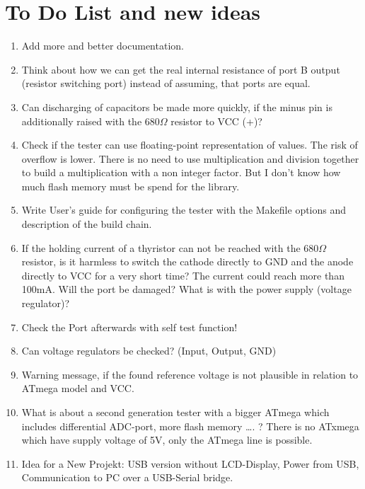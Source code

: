 
\chapter{To Do List and new ideas}
\label{sec:todo}

\begin{enumerate}
\item Add more and better documentation.
\item Think about how we can get the real internal resistance of port B output (resistor switching port) instead of assuming, that ports are equal.
\item Can discharging of capacitors be made more quickly, if the minus pin is additionally raised
with the \(680\Omega\) resistor to VCC (+)?
\item Check if the tester can use floating-point representation of  values. The risk of overflow  is lower.
There is no need to use multiplication and division together to build a multiplication with a non integer factor.
But I don't know how much flash memory must be spend for the library.
\item Write User's guide for configuring the tester with the Makefile options and description of the build chain.
\item If the holding current of a thyristor can not be reached with the \(680\Omega\) resistor, is it harmless to switch the cathode directly to GND
and the anode directly to VCC for a very short time?
The current could reach more than 100mA. Will the port be damaged? What is with the power supply (voltage regulator)?
\item Check the Port afterwards with self test function!
\item Can voltage regulators be checked? (Input, Output, GND)
\item Warning message, if the found reference voltage is not plausible in relation to ATmega model and VCC.
\item What is about a second generation tester with a bigger ATmega which includes differential ADC-port, more flash memory …. ?
There is no ATxmega which have supply voltage of 5V, only the ATmega line  is possible. 
\item Idea for a New Projekt: USB  version without LCD-Display, Power from USB, Communication to PC over a USB-Serial bridge.
\end{enumerate}
